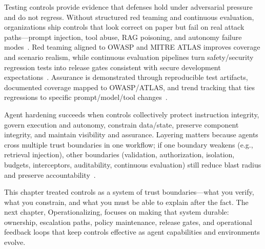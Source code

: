 \begin{TNtwocol}
  Testing controls provide evidence that defenses hold under adversarial pressure and do not regress. Without structured red teaming and continuous evaluation, organizations ship controls that look correct on paper but fail on real attack paths—prompt injection, tool abuse, RAG poisoning, and autonomy failure modes~\cite{owasp-top10-llm-2025,mitre-atlas}. Red teaming aligned to OWASP and MITRE ATLAS improves coverage and scenario realism, while continuous evaluation pipelines turn safety/security regression tests into release gates consistent with secure development expectations~\cite{owasp-top10-llm-2025,mitre-atlas,nist-sp800-218,nist-sp800-53b}. Assurance is demonstrated through reproducible test artifacts, documented coverage mapped to OWASP/ATLAS, and trend tracking that ties regressions to specific prompt/model/tool changes~\cite{nist-sp800-218,nist-sp800-53b}.

  \bigskip

  Agent hardening succeeds when controls collectively protect instruction integrity, govern execution and autonomy, constrain data/state, preserve component integrity, and maintain visibility and assurance. Layering matters because agents cross multiple trust boundaries in one workflow; if one boundary weakens (e.g., retrieval injection), other boundaries (validation, authorization, isolation, budgets, interceptors, auditability, continuous evaluation) still reduce blast radius and preserve accountability~\cite{owasp-top10-llm-2025,nist-sp800-207}.

  \medskip

  This chapter treated controls as a system of trust boundaries—what you verify, what you constrain, and what you must be able to explain after the fact. The next chapter, Operationalizing, focuses on making that system durable: ownership, escalation paths, policy maintenance, release gates, and operational feedback loops that keep controls effective as agent capabilities and environments evolve.

\end{TNtwocol}


